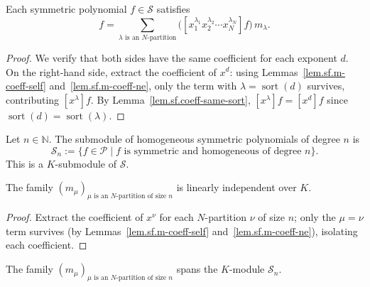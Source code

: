 \begin{theorem}
\label{thm.sf.m-basis.b}
\leanhelper
\leanok
Each symmetric polynomial $f \in \mathcal{S}$ satisfies
\[
f = \sum_{\lambda \text{ is an } N\text{-partition}}
\bigl([x_1^{\lambda_1} x_2^{\lambda_2} \cdots x_N^{\lambda_N}] f\bigr) \, m_\lambda.
\]
\end{theorem}

\begin{proof}
We verify that both sides have the same coefficient for each exponent $d$.
On the right-hand side, extract the coefficient of $x^d$: using
Lemmas~\ref{lem.sf.m-coeff-self} and~\ref{lem.sf.m-coeff-ne}, only the term with
$\lambda = \operatorname{sort}(d)$ survives, contributing
$[x^{\lambda}] f$. By Lemma~\ref{lem.sf.coeff-same-sort},
$[x^{\lambda}] f = [x^d] f$ since $\operatorname{sort}(d) = \operatorname{sort}(\lambda)$.
\end{proof}

\begin{definition}
\label{thm.sf.m-basis.c}
\leanhelper
\leanok
Let $n \in \mathbb{N}$. The submodule of homogeneous symmetric polynomials of degree $n$ is
\[
\mathcal{S}_n := \{f \in \mathcal{P} \mid f \text{ is symmetric and homogeneous of degree } n\}.
\]
This is a $K$-submodule of $\mathcal{S}$.
\end{definition}

\begin{theorem}
\label{thm.sf.m-basis.d.indep}
\leanhelper
\leanok
The family $(m_\mu)_{\mu \text{ is an } N\text{-partition of size } n}$ is linearly
independent over $K$.
\end{theorem}

\begin{proof}
\leanok
Extract the coefficient of $x^\nu$ for each $N$-partition $\nu$ of size $n$;
only the $\mu = \nu$ term survives (by Lemmas~\ref{lem.sf.m-coeff-self}
and~\ref{lem.sf.m-coeff-ne}), isolating each coefficient.
\end{proof}

\begin{theorem}
\label{thm.sf.m-basis.d.span}
\leanhelper
\leanok
The family $(m_\mu)_{\mu \text{ is an } N\text{-partition of size } n}$ spans the
$K$-module $\mathcal{S}_n$.
\end{theorem}

